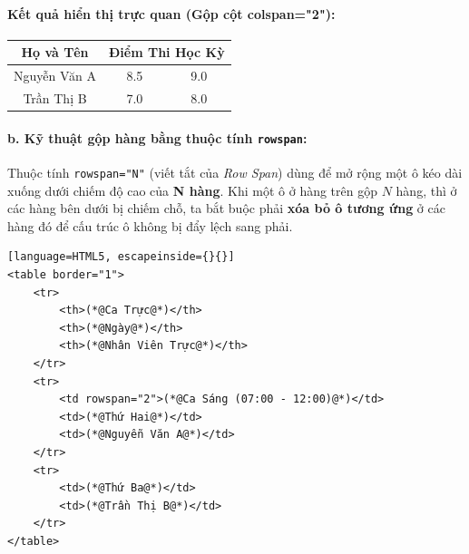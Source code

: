\documentclass[11pt,oneside]{book}
\renewcommand{\arraystretch}{1.2}
\newcommand{\codeinline}[1]{\textcolor{accentOrange}{\texttt{#1}}}
\begin{document}
\paragraph{\textbf{Kết quả hiển thị trực quan (Gộp cột colspan="2"):}}
\begin{prettyTableBox}[Kết Quả Hiển Thị Gộp Cột Colspan (border="1")]
\centering
\vspace{4pt}
\bgroup
\renewcommand{\arraystretch}{1.4}
\setlength{\tabcolsep}{14pt}
\begin{tabular}{|c|c|c|}
\hline
\textbf{Họ và Tên} & \multicolumn{2}{c|}{\textbf{Điểm Thi Học Kỳ}} \\
\hline
Nguyễn Văn A & 8.5 & 9.0 \\
\hline
Trần Thị B & 7.0 & 8.0 \\
\hline
\end{tabular}
\egroup
\vspace{4pt}
\end{prettyTableBox}

\paragraph{b. Kỹ thuật gộp hàng bằng thuộc tính \codeinline{rowspan}:}

Thuộc tính \codeinline{rowspan="N"} (viết tắt của \textit{Row Span}) dùng để mở rộng một ô kéo dài xuống dưới chiếm độ cao của \textbf{N hàng}. Khi một ô ở hàng trên gộp $N$ hàng, thì ở các hàng bên dưới bị chiếm chỗ, ta bắt buộc phải \textbf{xóa bỏ ô tương ứng} ở các hàng đó để cấu trúc ô không bị đẩy lệch sang phải.

\begin{codeWindow}
\begin{lstlisting}[language=HTML5, escapeinside={}{}]
<table border="1">
    <tr>
        <th>(*@Ca Trực@*)</th>
        <th>(*@Ngày@*)</th>
        <th>(*@Nhân Viên Trực@*)</th>
    </tr>
    <tr>
        <td rowspan="2">(*@Ca Sáng (07:00 - 12:00)@*)</td>
        <td>(*@Thứ Hai@*)</td>
        <td>(*@Nguyễn Văn A@*)</td>
    </tr>
    <tr>
        <td>(*@Thứ Ba@*)</td>
        <td>(*@Trần Thị B@*)</td>
    </tr>
</table>
\end{lstlisting}
\end{codeWindow}
\end{document}
